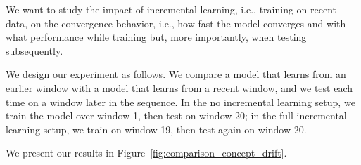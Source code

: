 We want to study the impact of incremental learning, i.e., training on recent data, on the convergence behavior, i.e., how fast the model converges and with what performance while training but, more importantly, when testing subsequently.

We design our experiment as follows. We compare a model that learns from an earlier window with a model that learns from a recent window, and we test each time on a window later in the sequence.
In the no incremental learning setup, we train the model over window 1, then test on window 20; in the full incremental learning setup, we train on window 19, then test again on window 20.

We present our results in Figure~\ref{fig:comparison_concept_drift}.
% 
